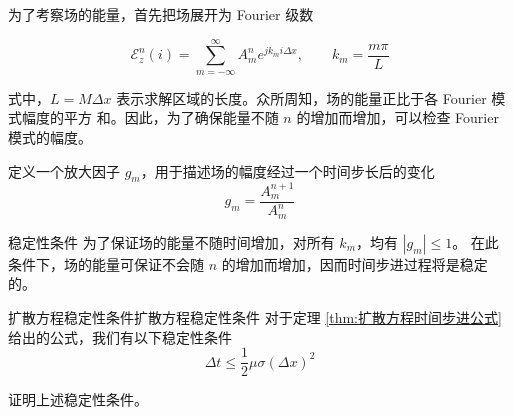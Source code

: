 \par 为了考察场的能量，首先把场展开为 Fourier 级数

\begin{equation}
    \mathscr{E}_z^{n}(i)=
    \sum_{m=-\infty}^{\infty}
    A_m^n e^{jk_m i \Delta x}, \qquad k_m = \frac{m\pi}{L}
    \label{场的 Fourier 展开}
\end{equation}

式中，$L=M \Delta x$ 表示求解区域的长度。众所周知，场的能量正比于各 Fourier 模式幅度的平方
和。因此，为了确保能量不随 $n$ 的增加而增加，可以检查 Fourier 模式的幅度。

\begin{definition}
    定义一个放大因子 $g_m$，用于描述场的幅度经过一个时间步长后的变化
    \begin{equation}
        g_m = \frac{A^{n+1}_m}{A^n_m}
    \end{equation}
\end{definition}

\begin{theorem}{稳定性条件}
    为了保证场的能量不随时间增加，对所有 $k_m$，均有 $|g_m| \leq 1$。
    在此条件下，场的能量可保证不会随 $n$ 的增加而增加，因而时间步进过程将是稳定的。
\end{theorem}

\begin{theorem}{扩散方程稳定性条件}{扩散方程稳定性条件}
    对于定理 \ref{thm:扩散方程时间步进公式} 给出的公式，我们有以下稳定性条件
    \begin{equation}
        \Delta t \leq \frac{1}{2} \mu \sigma (\Delta x)^2
    \end{equation}
\end{theorem}

\begin{exercise}
    证明上述稳定性条件。
\end{exercise}

